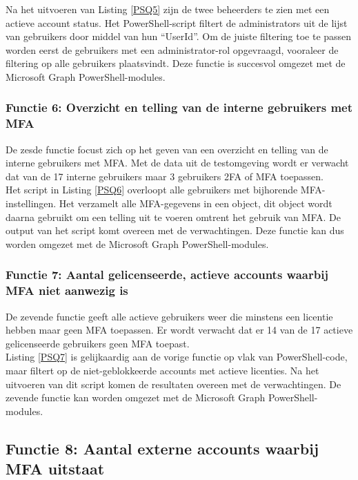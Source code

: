Na het uitvoeren van Listing \ref{PSQ5} zijn de twee beheerders te zien met een actieve account status. Het PowerShell-script filtert de administrators uit de lijst van gebruikers door middel van hun “UserId”. Om de juiste filtering toe te passen worden eerst de gebruikers met een administrator-rol opgevraagd, vooraleer de filtering op alle gebruikers plaatsvindt. Deze functie is succesvol omgezet met de Microsoft Graph PowerShell-modules.

\subsubsection{Functie 6: Overzicht en telling van de interne gebruikers met MFA}

De zesde functie focust zich op het geven van een overzicht en telling van de interne gebruikers met \ac{MFA}. Met de data uit de testomgeving wordt er verwacht dat van de 17 interne gebruikers maar 3 gebruikers \ac{2FA} of \ac{MFA} toepassen. \\

Het script in Listing \ref{PSQ6} overloopt alle gebruikers met bijhorende \ac{MFA}-instellingen. Het verzamelt alle \ac{MFA}-gegevens in een object, dit object wordt daarna gebruikt om een telling uit te voeren omtrent het gebruik van \ac{MFA}. De output van het script komt overeen met de verwachtingen. Deze functie kan dus worden omgezet met de Microsoft Graph PowerShell-modules. 

\subsubsection{Functie 7: Aantal gelicenseerde, actieve accounts waarbij MFA niet aanwezig is}

De zevende functie geeft alle actieve gebruikers weer die minstens een licentie hebben maar geen \ac{MFA} toepassen. Er wordt verwacht dat er 14 van de 17 actieve gelicenseerde gebruikers geen \ac{MFA} toepast. \\

Listing \ref{PSQ7} is gelijkaardig aan de vorige functie op vlak van PowerShell-code, maar filtert op de niet-geblokkeerde accounts met actieve licenties. Na het uitvoeren van dit script komen de resultaten overeen met de verwachtingen. De zevende functie kan worden omgezet met de Microsoft Graph PowerShell-modules.

\subsection{Functie 8: Aantal externe accounts waarbij MFA uitstaat}

